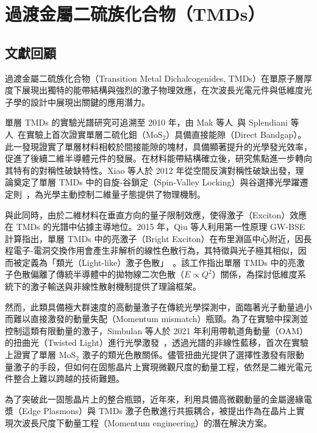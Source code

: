 \section{過渡金屬二硫族化合物（TMDs）}

\subsection{文獻回顧}
過渡金屬二硫族化合物（Transition Metal Dichalcogenides, TMDs）在單原子層厚度下展現出獨特的能帶結構與強烈的激子物理效應，在次波長光電元件與低維度光子學的設計中展現出關鍵的應用潛力。

單層 TMDs 的實驗光譜研究可追溯至 2010 年，由 Mak 等人~\cite{mak2010}與 Splendiani 等人~\cite{splendiani2010}在實驗上首次證實單層二硫化鉬（$\text{MoS}_2$）具備直接能隙（Direct Bandgap）。此一發現證實了單層材料相較於間接能隙的塊材，具備顯著提升的光學發光效率，促進了後續二維半導體元件的發展。在材料能帶結構確立後，研究焦點進一步轉向其特有的對稱性破缺特性。Xiao 等人於 2012 年從空間反演對稱性破缺出發，理論奠定了單層 TMDs 中的自旋-谷鎖定（Spin-Valley Locking）與谷選擇光學躍遷定則~\cite{xiao2012}，為光學主動控制二維量子態提供了物理機制。

與此同時，由於二維材料在垂直方向的量子限制效應，使得激子（Exciton）效應在 TMDs 的光譜中佔據主導地位。2015 年，Qiu 等人利用第一性原理 GW-BSE 計算指出，單層 TMDs 中的亮激子（Bright Exciton）在布里淵區中心附近，因長程電子-電洞交換作用會產生非解析的線性色散行為，其特徵與光子極其相似，因而被定義為「類光（Light-like）激子色散」~\cite{qiu2015}。該工作指出單層 TMDs 中的亮激子色散偏離了傳統半導體中的拋物線二次色散（$E \propto Q^2$）關係，為探討低維度系統下的激子輸送與非線性散射機制提供了理論框架。

然而，此類具備極大群速度的高動量激子在傳統光學探測中，面臨著光子動量過小而難以直接激發的動量失配（Momentum mismatch）瓶頸。為了在實驗中探測並控制這類有限動量的激子，Simbulan 等人於 2021 年利用帶軌道角動量（OAM）的扭曲光（Twisted Light）進行光學激發~\cite{simbulan2021}，透過光譜的非線性藍移，首次在實驗上證實了單層 $\text{MoS}_2$ 激子的類光色散關係。儘管扭曲光提供了選擇性激發有限動量激子的手段，但如何在固態晶片上實現微觀尺度的動量工程，依然是二維光電元件整合上難以跨越的技術難題。

為了突破此一固態晶片上的整合瓶頸，近年來，利用具備高微觀動量的金屬邊緣電漿（Edge Plasmons）與 TMDs 激子色散進行共振耦合，被提出作為在晶片上實現次波長尺度下動量工程（Momentum engineering）的潛在解決方案。

